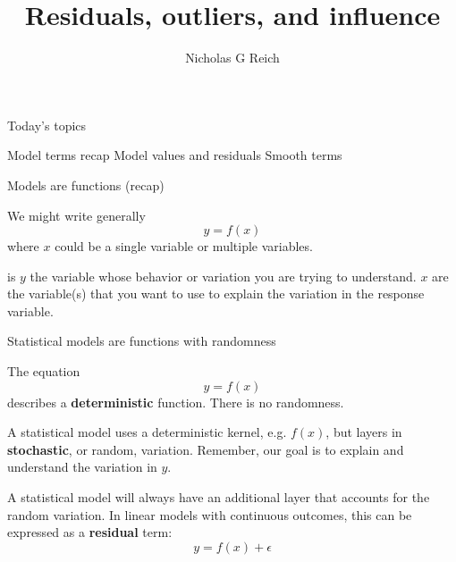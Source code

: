 \documentclass[table]{beamer}\usepackage[]{graphicx}\usepackage[]{color}
\title{Residuals, outliers, and influence}
\author{Nicholas G Reich}
\begin{document}
\begin{frame}[plain]
	\titlepage
\end{frame}











\begin{frame}{Today's topics}

\bi
    \myitem Model terms recap
    \myitem Model values and residuals
    \myitem Smooth terms
\ei



\end{frame}



\begin{frame}[fragile]{Models are functions (recap)}

We might write generally $$ y = f(x)$$ where $x$ could be a single variable or multiple variables.

\bi
   is $y$ the variable whose behavior or variation you are trying to understand.
   $x$ are the variable(s) that you want to use to explain the variation in the response variable.
\ei

\end{frame}



\begin{frame}[fragile]{Statistical models are functions with randomness}

\bi
\myitem The equation $$y = f(x)$$ describes a {\bf deterministic} function. There is no randomness.

\myitem A statistical model uses a deterministic kernel, e.g. $f(x)$, but layers in {\bf stochastic}, or random, variation. Remember, our goal is to explain and understand the variation in $y$.

\myitem A statistical model will always have an additional layer that accounts for the random variation. In linear models with continuous outcomes, this can be expressed as a {\bf residual} term:
$$y = f(x) + \epsilon$$
\ei

\end{frame}
\end{document}
